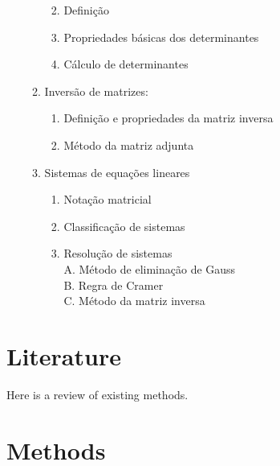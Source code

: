 \documentclass[
]{book}
\providecommand{\tightlist}{%
  \setlength{\itemsep}{0pt}\setlength{\parskip}{0pt}}
\begin{document}
\begin{enumerate}
\begin{enumerate}
    \begin{enumerate}
    \def\labelenumiii{\roman{enumiii}.}
    \tightlist
    \item
      Definição\\
    \item
      Propriedades básicas dos determinantes\\
    \item
      Cálculo de determinantes\\
    \end{enumerate}
  \item
    Inversão de matrizes:

    \begin{enumerate}
    \def\labelenumiii{\roman{enumiii}.}
    \tightlist
    \item
      Definição e propriedades da matriz inversa\\
    \item
      Método da matriz adjunta\\
    \end{enumerate}
  \item
    Sistemas de equações lineares

    \begin{enumerate}
    \def\labelenumiii{\roman{enumiii}.}
    \tightlist
    \item
      Notação matricial\\
    \item
      Classificação de sistemas\\
    \item
      Resolução de sistemas\\
      A. Método de eliminação de Gauss\\
      B. Regra de Cramer\\
      C. Método da matriz inversa
    \end{enumerate}
  \end{enumerate}
\end{enumerate}

\hypertarget{literature}{%
\chapter{Literature}\label{literature}}

Here is a review of existing methods.

\hypertarget{methods}{%
\chapter{Methods}\label{methods}}
\end{document}
